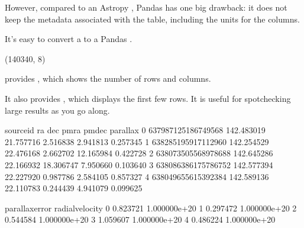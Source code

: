 \documentclass[letterpaper,10pt,english]{sphinxmanual}
\begin{document}
However, compared to an Astropy , Pandas has one big drawback: it does not keep the metadata associated with the table, including the units for the columns.

It’s easy to convert a  to a Pandas .

\begin{sphinxVerbatim}[commandchars=\\\{\}]
   

  
\end{sphinxVerbatim}

\begin{sphinxVerbatim}[commandchars=\\\{\}]
(140340, 8)
\end{sphinxVerbatim}

 provides , which shows the number of rows and columns.

It also provides , which displays the first few rows.  It is useful for spot\sphinxhyphen{}checking large results as you go along.

\begin{sphinxVerbatim}[commandchars=\\\{\}]
\end{sphinxVerbatim}

\begin{sphinxVerbatim}[commandchars=\\\{\}]
            source\PYGZus{}id          ra        dec       pmra      pmdec  parallax  \PYGZbs{}
0  637987125186749568  142.483019  21.757716  \PYGZhy{}2.516838   2.941813 \PYGZhy{}0.257345   
1  638285195917112960  142.254529  22.476168   2.662702 \PYGZhy{}12.165984  0.422728   
2  638073505568978688  142.645286  22.166932  18.306747  \PYGZhy{}7.950660  0.103640   
3  638086386175786752  142.577394  22.227920   0.987786  \PYGZhy{}2.584105 \PYGZhy{}0.857327   
4  638049655615392384  142.589136  22.110783   0.244439  \PYGZhy{}4.941079  0.099625   

   parallax\PYGZus{}error  radial\PYGZus{}velocity  
0        0.823721     1.000000e+20  
1        0.297472     1.000000e+20  
2        0.544584     1.000000e+20  
3        1.059607     1.000000e+20  
4        0.486224     1.000000e+20  
\end{sphinxVerbatim}
\end{document}
